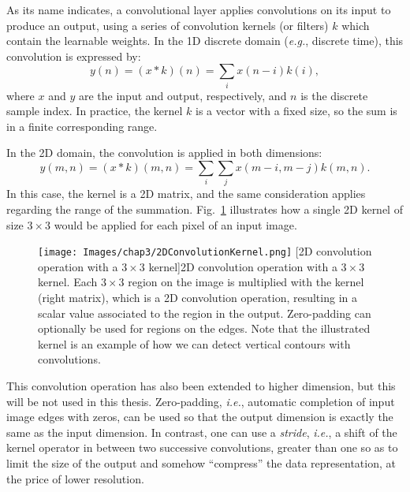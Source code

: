 As its name indicates, a convolutional layer applies convolutions on its input to produce an output, using a series of convolution kernels (or filters) $k$ which contain the learnable weights. In the 1D discrete domain (\emph{e.g.}, discrete time), this convolution is expressed by:
\begin{equation}
    y(n) = (x * k)(n) = \sum_i x(n-i)k(i),
\end{equation}
where $x$ and $y$ are the input and output, respectively, and $n$ is the discrete sample index. In practice, the kernel $k$ is a vector with a fixed size, so the sum is in a finite corresponding range. 

In the 2D domain, the convolution is applied in both dimensions:
\begin{equation}
    y(m,n) = (x * k)(m,n) = \sum_i \sum_j x(m-i,m-j) k(m,n).
\end{equation}
In this case, the kernel is a 2D matrix, and the same consideration applies regarding the range of the summation. Fig.~\ref{fig:2DconvolutionKernel} illustrates how a single 2D kernel of size $3 \times 3$ would be applied for each pixel of an input image.

\begin{figure}[t]
    \begin{center}
    \texttt{[image: Images/chap3/2DConvolutionKernel.png]}
    [2D convolution operation with a $3 \times 3$ kernel]{2D convolution operation with a $3 \times 3$ kernel. Each $3 \times 3$ region on the image is multiplied with the kernel (right matrix), which is a 2D convolution operation, resulting in a scalar value associated to the region in the output. Zero-padding can optionally be used for regions on the edges. Note that the illustrated kernel is an example of how we can detect vertical contours with convolutions.}
    \label{fig:2DconvolutionKernel}
    \end{center}
\end{figure}

This convolution operation has also been extended to higher dimension, but this will be not used in this thesis. Zero-padding, \emph{i.e.}, automatic completion of input image edges with zeros, can be used  so that the output dimension is exactly the same as the input dimension. In contrast, one can use a \textit{stride}, \emph{i.e.}, a shift of the kernel operator in between two successive convolutions, greater than one so as to limit the size of the output and somehow ``compress'' the data representation, at the price of lower resolution.


